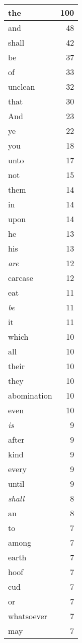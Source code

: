 \begin{center}
\begin{longtable}{l|r}
\hline \hline
\endlastfoot
the & 100 \\ \hline
and & 48 \\ \hline
shall & 42 \\ \hline
be & 37 \\ \hline
of & 33 \\ \hline
unclean & 32 \\ \hline
that & 30 \\ \hline
And & 23 \\ \hline
ye & 22 \\ \hline
you & 18 \\ \hline
unto & 17 \\ \hline
not & 15 \\ \hline
them & 14 \\ \hline
in & 14 \\ \hline
upon & 14 \\ \hline
he & 13 \\ \hline
his & 13 \\ \hline
\emph{are} & 12 \\ \hline
carcase & 12 \\ \hline
eat & 11 \\ \hline
\emph{be} & 11 \\ \hline
it & 11 \\ \hline
which & 10 \\ \hline
all & 10 \\ \hline
their & 10 \\ \hline
they & 10 \\ \hline
abomination & 10 \\ \hline
even & 10 \\ \hline
\emph{is} & 9 \\ \hline
after & 9 \\ \hline
kind & 9 \\ \hline
every & 9 \\ \hline
until & 9 \\ \hline
\emph{shall} & 8 \\ \hline
an & 8 \\ \hline
to & 7 \\ \hline
among & 7 \\ \hline
earth & 7 \\ \hline
hoof & 7 \\ \hline
cud & 7 \\ \hline
or & 7 \\ \hline
whatsoever & 7 \\ \hline
may & 7 \\ \hline

\end{longtable}
\end{center}
